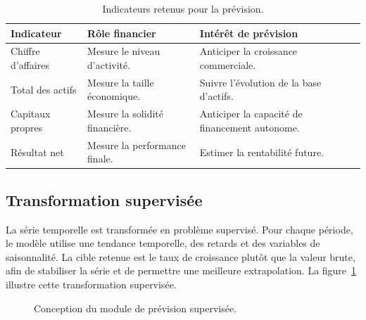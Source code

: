 \begin{table}[H]
\centering
\caption[Indicateurs prévus par le module ML]{Indicateurs retenus pour la prévision.}
\label{tab:targetsml}
\begin{tabularx}{\linewidth}{|p{3.5cm}|X|X|}
\hline
\textbf{Indicateur} & \textbf{Rôle financier} & \textbf{Intérêt de prévision} \\ \hline
Chiffre d'affaires & Mesure le niveau d'activité. & Anticiper la croissance commerciale. \\ \hline
Total des actifs & Mesure la taille économique. & Suivre l'évolution de la base d'actifs. \\ \hline
Capitaux propres & Mesure la solidité financière. & Anticiper la capacité de financement autonome. \\ \hline
Résultat net & Mesure la performance finale. & Estimer la rentabilité future. \\ \hline
\end{tabularx}
\end{table}

\subsection{Transformation supervisée}
\par La série temporelle est transformée en problème supervisé. Pour chaque
période, le modèle utilise une tendance temporelle, des retards et des variables
de saisonnalité. La cible retenue est le taux de croissance plutôt que la valeur
brute, afin de stabiliser la série et de permettre une meilleure extrapolation.
La figure~\ref{fig:conceptionml} illustre cette transformation supervisée.

\begin{figure}[H]
\centering
{}
\caption[Conception du module de prévision]{Conception du module de prévision supervisée.}
\label{fig:conceptionml}
\end{figure}

